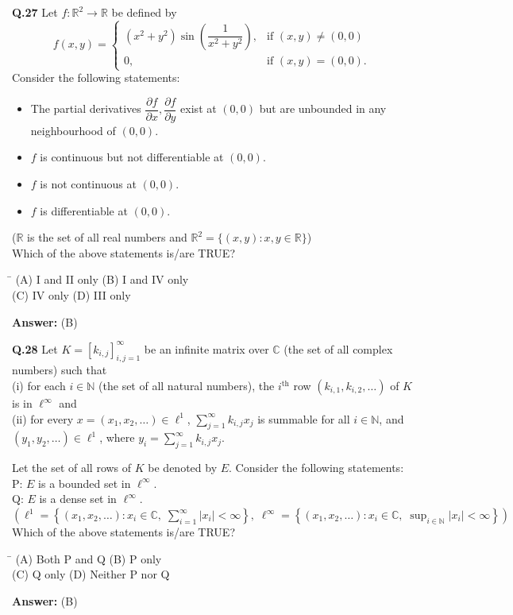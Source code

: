 \documentclass[11pt,a4paper]{article}
\newcommand{\optsfourA}[4]{%
  \begin{tabbing}
    \hspace{0.48\linewidth}\=\kill
    (A) #1 \> (B) #2 \\[2pt]
    (C) #3 \> (D) #4
  \end{tabbing}%
}
\newcommand{\ans}[1]{\textbf{Answer:} #1\par\medskip}
\begin{document}
\textbf{Q.27} Let $f : \mathbb{R}^2 \to \mathbb{R}$ be defined by
\[
  f(x, y) = \begin{cases}
    (x^2 + y^2)\sin\!\left(\dfrac{1}{x^2 + y^2}\right), & \text{if } (x, y) \neq (0, 0) \\[8pt]
    0, & \text{if } (x, y) = (0, 0).
  \end{cases}
\]
Consider the following statements:
\begin{itemize}
  \setlength{\itemsep}{1pt}\setlength{\parskip}{0pt}
  \item[I.] The partial derivatives $\dfrac{\partial f}{\partial x}, \dfrac{\partial f}{\partial y}$ exist at $(0, 0)$ but are unbounded in any neighbourhood of $(0, 0)$.
  \item[II.] $f$ is continuous but not differentiable at $(0, 0)$.
  \item[III.] $f$ is not continuous at $(0, 0)$.
  \item[IV.] $f$ is differentiable at $(0, 0)$.
\end{itemize}
($\mathbb{R}$ is the set of all real numbers and $\mathbb{R}^2 = \{(x, y) : x, y \in \mathbb{R}\}$)\\
Which of the above statements is/are TRUE?
\optsfourA{I and II only}{I and IV only}{IV only}{III only}
\ans{(B)}

\textbf{Q.28} Let $K = [k_{i,j}]_{i,j=1}^{\infty}$ be an infinite matrix over $\mathbb{C}$ (the set of all complex numbers) such that\\
(i) for each $i \in \mathbb{N}$ (the set of all natural numbers), the $i^{\text{th}}$ row $(k_{i,1}, k_{i,2}, \dots)$ of $K$ is in $\ell^\infty$ and\\
(ii) for every $x = (x_1, x_2, \dots) \in \ell^1$, $\displaystyle\sum_{j=1}^{\infty} k_{i,j} x_j$ is summable for all $i \in \mathbb{N}$, and $(y_1, y_2, \dots) \in \ell^1$, where $y_i = \displaystyle\sum_{j=1}^{\infty} k_{i,j} x_j$.

Let the set of all rows of $K$ be denoted by $E$. Consider the following statements:\\
P: $E$ is a bounded set in $\ell^\infty$.\\
Q: $E$ is a dense set in $\ell^\infty$.\\
$\left(\ell^1 = \left\{(x_1, x_2, \dots) : x_i \in \mathbb{C},\; \sum_{i=1}^{\infty} |x_i| < \infty\right\},\; \ell^\infty = \left\{(x_1, x_2, \dots) : x_i \in \mathbb{C},\; \sup_{i \in \mathbb{N}} |x_i| < \infty\right\}\right)$\\
Which of the above statements is/are TRUE?
\optsfourA{Both P and Q}{P only}{Q only}{Neither P nor Q}
\ans{(B)}
\end{document}
